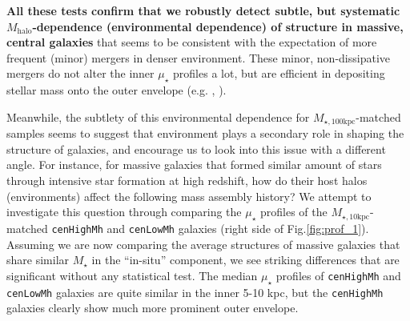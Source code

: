 \documentclass{emulateapj}
\def\rbcg{\texttt{cenHighMh}}
\def\nbcg{\texttt{cenLowMh}}
\def\mstar{{$M_{\star}$}}
\def\mhalo{{$M_{\mathrm{halo}}$}}
\def\minn{{$M_{\star,10\mathrm{kpc}}$}}
\def\mtot{{$M_{\star,100\mathrm{kpc}}$}}
\def\mden{{$\mu_{\star}$}}
\begin{document}
\begin{CJK*}{UTF8}{gbsn}
    \textbf{All these tests confirm that we robustly detect subtle, but systematic 
    \mhalo{}-dependence (environmental dependence) of structure in massive, 
    central galaxies} that seems to be consistent with the expectation of more frequent 
    (minor) mergers in denser environment. 
    These minor, non-dissipative mergers do not alter the inner \mden{} profiles 
    a lot, but are efficient in depositing stellar mass onto the outer envelope
    (e.g. \citealt{Hilz2013}, \citealt{Oogi2013}).
    

    Meanwhile, the subtlety of this environmental dependence for \mtot{}-matched 
    samples seems to suggest that environment plays a secondary role in shaping 
    the structure of galaxies, and encourage us to look into this issue with a 
    different angle. 
    For instance, for massive galaxies that formed similar amount of stars through 
    intensive star formation at high redshift, how do their host halos (environments) 
    affect the following mass assembly history? 
    We attempt to investigate this question through comparing the \mden{} profiles of 
    the \minn{}-matched \rbcg{} and \nbcg{} galaxies (right side of 
    Fig.\ref{fig:prof_1}).
    Assuming we are now comparing the average structures of massive galaxies that share 
    similar \mstar{} in the ``in-situ'' component, we see striking differences that 
    are significant without any statistical test.     
    The median \mden{} profiles of \rbcg{} and \nbcg{} galaxies are quite similar in 
    the inner 5-10 kpc, but the \rbcg{} galaxies clearly show much more prominent
    outer envelope.     
    

\end{CJK*}
\end{document}
